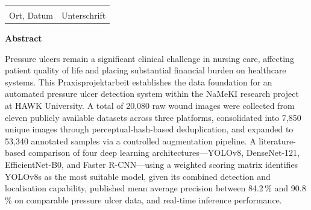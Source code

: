 \documentclass[a4paper,12pt,twoside]{report}
\begin{document}
\vspace{3cm}

\begin{tabular}{p{6cm}p{6cm}}
  \hrulefill & \hrulefill \\
  Ort, Datum & Unterschrift
\end{tabular}

\clearpage
\thispagestyle{empty}
\vspace*{2cm}
\begin{center}
  {\Large\bfseries Abstract}
\end{center}
\vspace{1cm}

Pressure ulcers remain a significant clinical challenge in nursing care, affecting
patient quality of life and placing substantial financial burden on healthcare
systems. This Praxisprojektarbeit establishes the data foundation for an
automated pressure ulcer detection system within the NaMeKI research project at
HAWK University. A total of 20,080 raw wound images were collected from eleven
publicly available datasets across three platforms, consolidated into 7,850
unique images through perceptual-hash-based deduplication, and expanded to
53,340 annotated samples via a controlled augmentation pipeline. A
literature-based comparison of four deep learning architectures---YOLOv8,
DenseNet-121, EfficientNet-B0, and Faster R-CNN---using a weighted scoring
matrix identifies YOLOv8s as the most suitable model, given its combined
detection and localisation capability, published mean average precision between
84.2\,\% and 90.8\,\% on comparable pressure ulcer data, and real-time
inference performance.

\clearpage
\tableofcontents

\clearpage
\listoffigures
\clearpage
\listoftables

\clearpage
\end{document}
